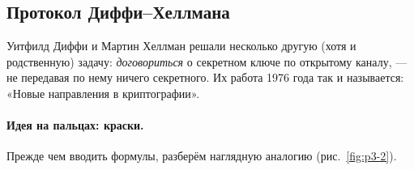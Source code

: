 \subsection{Протокол Диффи--Хеллмана}

Уитфилд Диффи и Мартин Хеллман решали несколько другую (хотя и родственную) задачу: \emph{договориться} о секретном ключе по открытому каналу, --- не передавая по нему ничего секретного. Их работа 1976 года так и называется: «Новые направления в криптографии».

\paragraph*{Идея на пальцах: краски.} Прежде чем вводить формулы, разберём наглядную аналогию (рис.~\ref{fig:p3-2}).


